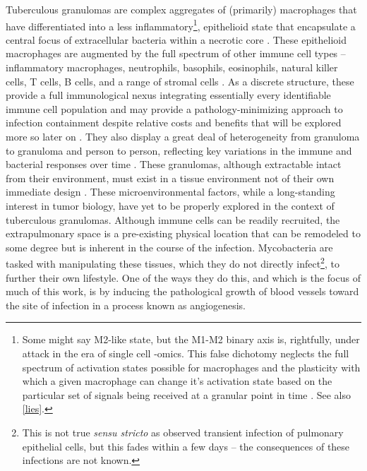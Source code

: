 Tuberculous granulomas are complex aggregates of (primarily) macrophages that have differentiated into a less inflammatory\footnote{Some might say M2\hyp{}like state, but the M1\hyp{}M2 binary axis is, rightfully, under attack in the era of single cell \hyp{}omics. This false dichotomy neglects the full spectrum of activation states possible for macrophages and the plasticity with which a given macrophage can change it's activation state based on the particular set of signals being received at a granular point in time \citep{Martinez2014, Ley2017}. See also \autoref{lies}.}, epithelioid state that encapsulate a central focus of extracellular bacteria within a necrotic core \citep{Boros2003, Rubin2009, Cronan2016}. These epithelioid macrophages are augmented by the full spectrum of other immune cell types -- inflammatory macrophages, neutrophils, basophils, eosinophils, natural killer cells, T cells, B cells, and a range of stromal cells \citep{Russell2007, Ramakrishnan2012}. As a discrete structure, these provide a full immunological nexus integrating essentially every identifiable immune cell population and may provide a pathology-minimizing approach to infection containment despite relative costs and benefits that will be explored more so later on \citep{Casadevall2003}. They also display a great deal of heterogeneity from granuloma to granuloma and person to person, reflecting key variations in the immune and bacterial responses over time \citep{Cadena2017, Gideon2022}. These granulomas, although extractable intact from their environment, must exist in a tissue environment not of their own immediate design \citep{Datta2015, Kaplan2003, McCaffrey2022, Cronan2018}. These microenvironmental factors, while a long\hyp{}standing interest in tumor biology, have yet to be properly explored in the context of tuberculous granulomas. Although immune cells can be readily recruited, the extrapulmonary space is a pre\hyp{}existing physical location that can be remodeled to some degree but is inherent in the course of the infection. Mycobacteria are tasked with manipulating these tissues, which they do not directly infect\footnote{This is not true \textit{sensu stricto} as \citet{Cohen2018} observed transient infection of pulmonary epithelial cells, but this fades within a few days -- the consequences of these infections are not known.}, to further their own lifestyle. One of the ways they do this, and which is the focus of much of this work, is by inducing the pathological growth of blood vessels toward the site of infection in a process known as angiogenesis.

